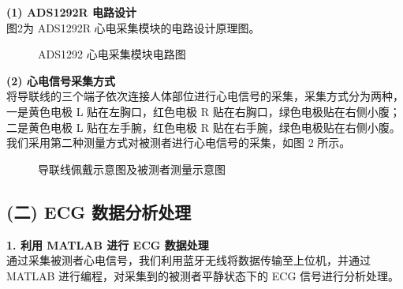 \documentclass[a4paper,12pt]{article}
\begin{document}
\textbf{(1) ADS1292R 电路设计}\\
图2为 ADS1292R 心电采集模块的电路设计原理图。

\begin{figure}[H]
    \centering
    \caption{ADS1292 心电采集模块电路图}
\end{figure}

\textbf{(2) 心电信号采集方式}\\
将导联线的三个端子依次连接人体部位进行心电信号的采集，采集方式分为两种，一是黄色电极 L 贴在左胸口，红色电极 R 贴在右胸口，绿色电极贴在右侧小腹；二是黄色电极 L 贴在左手腕，红色电极 R 贴在右手腕，绿色电极贴在右侧小腹。我们采用第二种测量方式对被测者进行心电信号的采集，如图 2 所示。

\begin{figure}[H]
    \centering
    \caption{导联线佩戴示意图及被测者测量示意图}
\end{figure}

\subsection*{(二) ECG 数据分析处理}
\textbf{1. 利用 MATLAB 进行 ECG 数据处理}\\
通过采集被测者心电信号，我们利用蓝牙无线将数据传输至上位机，并通过 MATLAB 进行编程，对采集到的被测者平静状态下的 ECG 信号进行分析处理。
\end{document}
